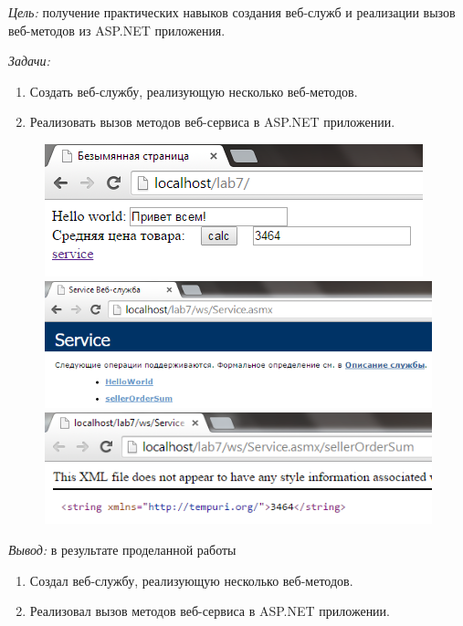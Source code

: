 \documentclass[pscyr]{hedlab}
\begin{document}
    \makeheader
    \emph{Цель:} получение практических навыков создания веб-служб и
      реализации вызов веб-методов из ASP.NET приложения.

    \emph{Задачи:} 
    \begin{enumerate}
        \item Создать веб-службу, реализующую несколько веб-методов.
        \item Реализовать вызов методов веб-сервиса в ASP.NET приложении.
    \end{enumerate}
    
    

    

    

    \pagebreak

    \begin{figure}[h!]
        \center
        \includegraphics[width=.6\textwidth]{01} \\
        \includegraphics[width=.6\textwidth]{02} \\
        \includegraphics[width=.6\textwidth]{03}
    \end{figure}

    \emph{Вывод:} в результате проделанной работы
    \begin{enumerate}
        \item Создал веб-службу, реализующую несколько веб-методов.
        \item Реализовал вызов методов веб-сервиса в ASP.NET приложении.
    \end{enumerate}
\end{document}
